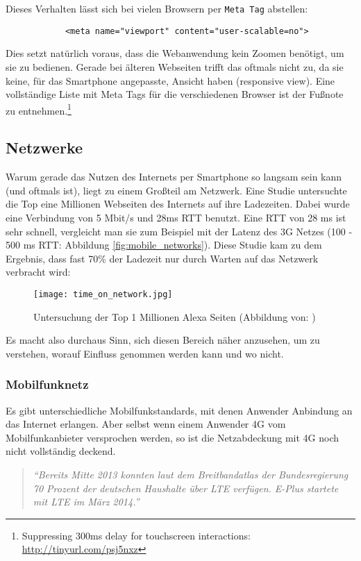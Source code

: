 		Dieses Verhalten lässt sich bei vielen Browsern per \texttt{Meta Tag} abstellen:

		\begin{lstlisting}
			<meta name="viewport" content="user-scalable=no">
		\end{lstlisting}

		Dies setzt natürlich voraus, dass die Webanwendung kein Zoomen benötigt, um sie zu bedienen. Gerade bei älteren Webseiten trifft das oftmals nicht zu, da sie keine, für das Smartphone angepasste, Ansicht haben (responsive view). Eine vollständige Liste mit Meta Tags für die verschiedenen Browser ist der Fußnote zu entnehmen.\footnote{Suppressing 300ms delay for touchscreen interactions: \url{http://tinyurl.com/psj5nxz}}


	\subsection{Netzwerke} %
	\label{sub:netzwerke}
		Warum gerade das Nutzen des Internets per Smartphone so langsam sein kann (und oftmals ist), liegt zu einem Großteil am Netzwerk. Eine Studie untersuchte die Top eine Millionen Webseiten des Internets auf ihre Ladezeiten. Dabei wurde eine Verbindung von 5 Mbit/s und 28ms RTT benutzt. Eine RTT von 28 ms ist sehr schnell, vergleicht man sie zum Beispiel mit der Latenz des 3G Netzes (100 - 500 ms RTT: Abbildung \ref{fig:mobile_networks}). Diese Studie kam zu dem Ergebnis, dass fast 70\% der Ladezeit nur durch Warten auf das Netzwerk verbracht wird:

		\begin{figure}[htbp]
			\begin{center}
				\texttt{[image: time\_on\_network.jpg]}
				\caption{Untersuchung der Top 1 Millionen Alexa Seiten (Abbildung von: \autocite{alexa})}
				\label{fig:time_on_network}
			\end{center}
		\end{figure}

		Es macht also durchaus Sinn, sich diesen Bereich näher anzusehen, um zu verstehen, worauf Einfluss genommen werden kann und wo nicht.

		\subsubsection{Mobilfunknetz} %
		\label{ssub:Mobilfunknetz}
			Es gibt unterschiedliche Mobilfunkstandards, mit denen Anwender Anbindung an das Internet erlangen. Aber selbst wenn einem Anwender 4G vom Mobilfunkanbieter versprochen werden, so ist die Netzabdeckung mit 4G noch nicht vollständig deckend.
			\begin{quote}
				\textit{"`Bereits Mitte 2013 konnten laut dem Breitbandatlas der Bundesregierung 70 Prozent der deutschen Haushalte über LTE verfügen. E-Plus startete mit LTE im März 2014."' \autocite{netzagentur}}
			\end{quote}

